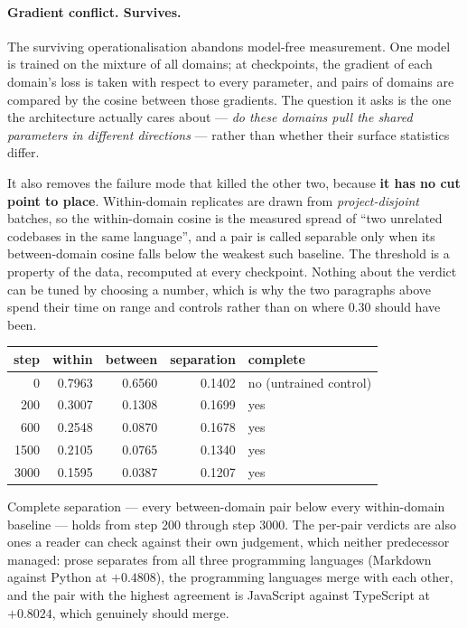 \documentclass[11pt]{article}
\begin{document}
\paragraph{Gradient conflict. Survives.} The surviving operationalisation abandons model-free measurement. One model is trained on the mixture of all domains; at checkpoints, the gradient of each domain's loss is taken with respect to every parameter, and pairs of domains are compared by the cosine between those gradients. The question it asks is the one the architecture actually cares about --- \emph{do these domains pull the shared parameters in different directions} --- rather than whether their surface statistics differ.

It also removes the failure mode that killed the other two, because \textbf{it has no cut point to place}. Within-domain replicates are drawn from \emph{project-disjoint} batches, so the within-domain cosine is the measured spread of ``two unrelated codebases in the same language'', and a pair is called separable only when its between-domain cosine falls below the weakest such baseline. The threshold is a property of the data, recomputed at every checkpoint. Nothing about the verdict can be tuned by choosing a number, which is why the two paragraphs above spend their time on range and controls rather than on where $0.30$ should have been.

\begin{center}
\begin{tabular}{@{}rrrrl@{}}
\toprule
step & within & between & separation & complete \\
\midrule
0    & 0.7963 & 0.6560 & 0.1402 & no \quad (untrained control) \\
200  & 0.3007 & 0.1308 & 0.1699 & yes \\
600  & 0.2548 & 0.0870 & 0.1678 & yes \\
1500 & 0.2105 & 0.0765 & 0.1340 & yes \\
3000 & 0.1595 & 0.0387 & 0.1207 & yes \\
\bottomrule
\end{tabular}
\end{center}

Complete separation --- every between-domain pair below every within-domain baseline --- holds from step 200 through step 3000. The per-pair verdicts are also ones a reader can check against their own judgement, which neither predecessor managed: prose separates from all three programming languages (Markdown against Python at $+0.4808$), the programming languages merge with each other, and the pair with the highest agreement is JavaScript against TypeScript at $+0.8024$, which genuinely should merge.
\end{document}
